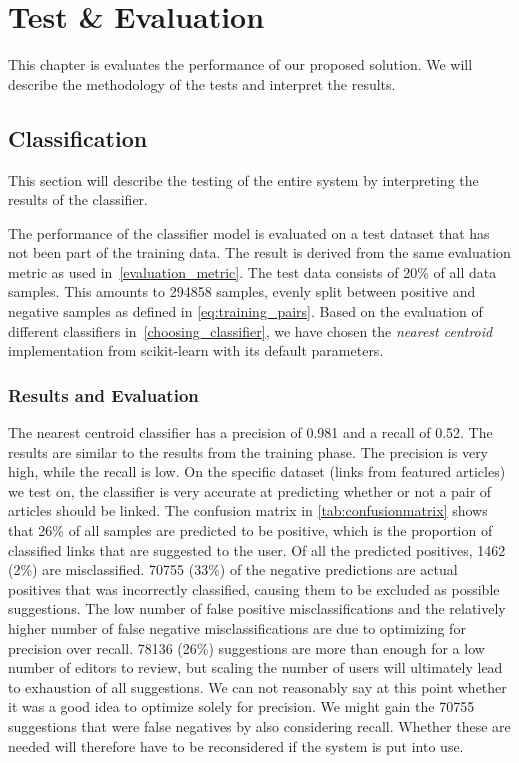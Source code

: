 \chapter{Test \& Evaluation}\label{chap:testeval}
This chapter is evaluates the performance of our proposed solution. We will describe the methodology of the tests and interpret the results.

\section{Classification}\label{sec:classification_evaluation}
This section will describe the testing of the entire system by interpreting the results of the classifier.

The performance of the classifier model is evaluated on a test dataset that has not been part of the training data. The result is derived from the same evaluation metric as used in~\cref{evaluation_metric}. The test data consists of 20\% of all data samples. This amounts to \num{294858} samples, evenly split between positive and negative samples as defined in \cref{eq:training_pairs}. Based on the evaluation of different classifiers in~\cref{choosing_classifier}, we have chosen the \emph{nearest centroid} implementation from scikit-learn with its default parameters.

\subsection{Results and Evaluation}
The nearest centroid classifier has a precision of \num{0.981} and a recall of \num{0.52}. The results are similar to the results from the training phase. The precision is very high, while the recall is low. On the specific dataset (links from featured articles) we test on, the classifier is very accurate at predicting whether or not a pair of articles should be linked. The confusion matrix in \cref{tab:confusionmatrix} shows that 26\% of all samples are predicted to be positive, which is the proportion of classified links that are suggested to the user.  Of all the predicted positives, \num{1462} (2\%) are misclassified. \num{70755} (33\%) of the negative predictions are actual positives that was incorrectly classified, causing them to be excluded as possible suggestions. The low number of false positive misclassifications and the relatively higher number of false negative misclassifications are due to optimizing for precision over recall.  \num{78136} (26\%) suggestions are more than enough for a low number of editors to review, but scaling the number of users will ultimately lead to exhaustion of all suggestions. We can not reasonably say at this point whether it was a good idea to optimize solely for precision. We might gain the \num{70755} suggestions that were false negatives by also considering recall. Whether these are needed will therefore have to be reconsidered if the system is put into use.

